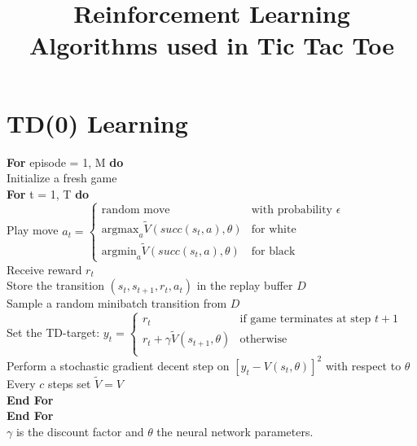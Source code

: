 \documentclass{article}
\title{Reinforcement Learning Algorithms used in Tic Tac Toe}
\begin{document}
\maketitle


\section{TD(0) Learning}

\textbf{For} episode = 1, M \textbf{do} \\
\indent Initialize a fresh game \\
\indent \textbf {For} t = 1, T \textbf{do} \\
\indent \indent Play move
$
a_t= 
\begin{cases}
\text{random move} 									& \text{with probability } \epsilon \\
\text{argmax}_a \tilde{V}(succ(s_t, a), \theta)     & \text{for white} \\
\text{argmin}_a \tilde{V}(succ(s_t, a), \theta)     & \text{for black}
\end{cases}
$ \\
\indent \indent Receive reward $r_t$  \\
\indent \indent Store the transition $(s_t, s_{t+1}, r_t, a_t)$ in the replay buffer $D$ \\
\indent \indent Sample a random minibatch transition from $D$  \\
\indent \indent Set the TD-target: 
$
y_t= 
\begin{cases}
	r_t 										& \text{if game terminates at step } t+1 \\
	r_{t} + \gamma \tilde{V}(s_{t+1}, \theta)   & \text{otherwise} \\
\end{cases}
$ \\
\indent \indent Perform a stochastic gradient decent step on $[y_t - V(s_t, \theta)]^2$ with respect to $\theta$  \\
\indent \indent Every $c$ steps set $\tilde{V} = V$   \\
\indent  \textbf {End For}  \\
\textbf {End For} \\

\noindent $\gamma$ is the discount factor and $\theta$ the neural network parameters.
\end{document}
